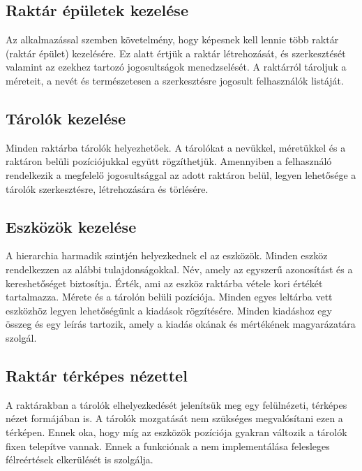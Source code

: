 \subsection{Raktár épületek kezelése}
Az alkalmazással szemben követelmény, hogy képesnek kell lennie több raktár (raktár épület) kezelésére.
Ez alatt értjük a raktár létrehozását, és szerkesztését valamint az ezekhez tartozó jogosultságok menedzselését.
A raktárról tároljuk a méreteit, a nevét és természetesen a szerkesztésre jogosult felhasználók listáját.

\subsection{Tárolók kezelése}
Minden raktárba tárolók helyezhetőek. A tárolókat a nevükkel, méretükkel és a raktáron belüli pozíciójukkal együtt rögzíthetjük.
Amennyiben a felhasználó rendelkezik a megfelelő jogosultsággal az adott raktáron belül, legyen lehetősége a tárolók szerkesztésre, létrehozására és törlésére.

\subsection{Eszközök kezelése}
A hierarchia harmadik szintjén helyezkednek el az eszközök. 
Minden eszköz rendelkezzen az alábbi tulajdonságokkal.
Név, amely az egyszerű azonosítást és a kereshetőséget biztosítja.
Érték, ami az eszköz raktárba vétele kori értékét tartalmazza.
Mérete és a tárolón belüli pozíciója. 
Minden egyes leltárba vett eszközhöz legyen lehetőségünk a kiadások rögzítésére.
Minden kiadáshoz egy összeg és egy leírás tartozik, amely a kiadás okának és mértékének magyarázatára szolgál.

\subsection{Raktár térképes nézettel}
A raktárakban a tárolók elhelyezkedését jelenítsük meg egy felülnézeti, térképes nézet formájában is.
A tárolók mozgatását nem szükséges megvalósítani ezen a térképen.
Ennek oka, hogy míg az eszközök pozíciója gyakran változik a tárolók fixen telepítve vannak.
Ennek a funkciónak a nem implementálása felesleges félreértések elkerülését is szolgálja.

